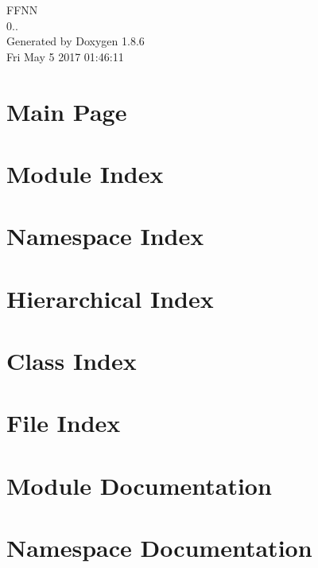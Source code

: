 \documentclass[twoside]{book}
\newcommand{\clearemptydoublepage}{%
  \newpage{\pagestyle{empty}\cleardoublepage}%
}
\begin{document}
\hypersetup{pageanchor=false}
\begin{titlepage}
\vspace*{7cm}
\begin{center}%
{\Large F\-F\-N\-N \\[1ex]\large 0.. }\\
\vspace*{1cm}
{\large Generated by Doxygen 1.8.6}\\
\vspace*{0.5cm}
{\small Fri May 5 2017 01:46:11}\\
\end{center}
\end{titlepage}
\clearemptydoublepage
\tableofcontents
\clearemptydoublepage
{}
\hypersetup{pageanchor=true}

\chapter{Main Page}
\label{index}\hypertarget{index}{}
\chapter{Module Index}

\chapter{Namespace Index}

\chapter{Hierarchical Index}

\chapter{Class Index}

\chapter{File Index}

\chapter{Module Documentation}

\chapter{Namespace Documentation}















\end{document}
